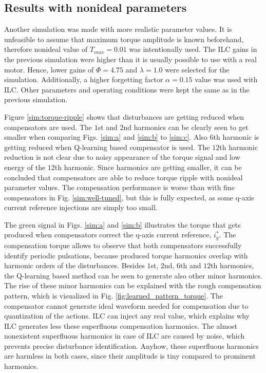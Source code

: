 \subsection{Results with nonideal parameters}
Another simulation was made with more realistic parameter values. It is unfeasible to assume that maximum torque amplitude is known beforehand, therefore nonideal value of $T_{max}=0.01$ was intentionally used. The ILC gains in the previous simulation were higher than it is usually possible to use with a real motor. Hence, lower gains of $\Phi = 4.75$ and $\lambda = 1.0$ were selected for the simulation. Additionally, a higher forgetting factor $\alpha = 0.15$ value was used with ILC. Other parameters and operating conditions were kept the same as in the previous simulation.

Figure \ref{sim:torque-ripple} shows that disturbances are getting reduced when compensators are used. The $1$st and $2$nd harmonics can be clearly seen to get smaller when comparing Figs. \ref{sim:a} and \ref{sim:b} to \ref{sim:c}. Also $6$th harmonic is getting reduced when Q-learning based compensator is used. The $12$th harmonic reduction is not clear due to noisy appearance of the torque signal and low energy of the $12$th harmonic. Since harmonics are getting smaller, it can be concluded that compensators are able to reduce torque ripple with nonideal parameter values. The compensation performance is worse than with fine compensators in Fig. \ref{sim:well-tuned}, but this is fully expected, as some q-axis current reference injections are simply too small.

The green signal in Figs. \ref{sim:a} and \ref{sim:b} illustrates the torque that gets produced when compensators correct the q-axis current reference, $i_q^*$. The compensation torque allows to observe that both compensators successfully identify periodic pulsations, because produced torque harmonics overlap with harmonic orders of the disturbances. Besides $1$st, $2$nd, $6$th and $12$th harmonics, the Q-learning based method can be seen to generate also other minor harmonics. The rise of these minor harmonics can be explained with the rough compensation pattern, which is visualized in Fig. \ref{fig:learned_pattern_torque}. The compensator cannot generate ideal waveform needed for compensation due to quantization of the actions. ILC can inject any real value, which explains why ILC generates less these superfluous compensation harmonics. The almost nonexistent superfluous harmonics in case of ILC are caused by noise, which prevents precise disturbance identification. Anyhow, these superfluous harmonics are harmless in both cases, since their amplitude is tiny compared to prominent harmonics.


